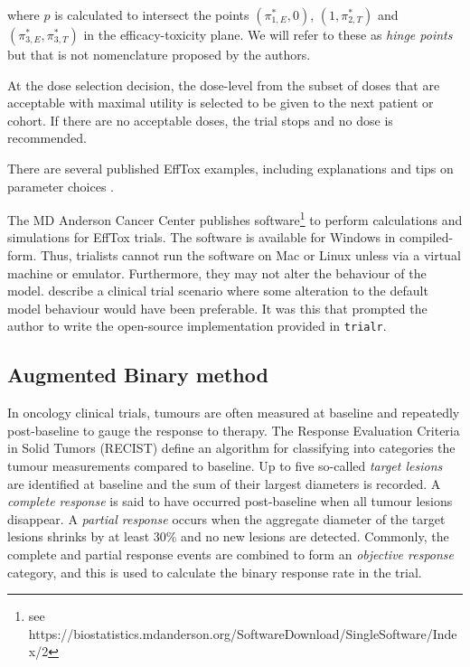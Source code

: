 \documentclass[article]{jss}
\begin{document}
where \(p\) is calculated to intersect the points \((\pi_{1,E}^*, 0)\),
\((1, \pi_{2,T}^*)\) and \((\pi_{3,E}^*, \pi_{3,T}^*)\) in the
efficacy-toxicity plane. We will refer to these as \emph{hinge points}
but that is not nomenclature proposed by the authors.

At the dose selection decision, the dose-level from the subset of doses
that are acceptable with maximal utility is selected to be given to the
next patient or cohort. If there are no acceptable doses, the trial
stops and no dose is recommended.

There are several published EffTox examples, including explanations and
tips on parameter choices
\citep{Thall2004, Thall2006, Thall2014, Brock2017a}.

The MD Anderson Cancer Center publishes
software\footnote{see https://biostatistics.mdanderson.org/SoftwareDownload/SingleSoftware/Index/2}
to perform calculations and simulations for EffTox trials. The software
is available for Windows in compiled-form. Thus, trialists cannot run
the software on Mac or Linux unless via a virtual machine or emulator.
Furthermore, they may not alter the behaviour of the model.
\citep{Brock2017a} describe a clinical trial scenario where some
alteration to the default model behaviour would have been preferable. It
was this that prompted the author to write the open-source
implementation provided in \texttt{trialr}.

\hypertarget{augmented-binary-method}{%
\subsection{Augmented Binary method}\label{augmented-binary-method}}

In oncology clinical trials, tumours are often measured at baseline and
repeatedly post-baseline to gauge the response to therapy. The Response
Evaluation Criteria in Solid Tumors (RECIST)\citep{Eisenhauer2009}
define an algorithm for classifying into categories the tumour
measurements compared to baseline. Up to five so-called
\textit{target lesions} are identified at baseline and the sum of their
largest diameters is recorded. A \textit{complete response} is said to
have occurred post-baseline when all tumour lesions disappear. A
\textit{partial response} occurs when the aggregate diameter of the
target lesions shrinks by at least 30\% and no new lesions are detected.
Commonly, the complete and partial response events are combined to form
an \textit{objective response} category, and this is used to calculate
the binary response rate in the trial.
\end{document}
